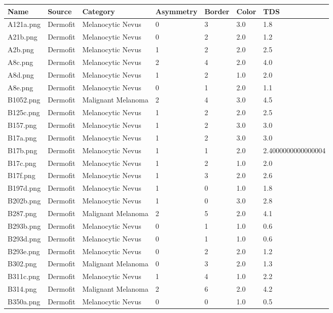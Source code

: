 
\begin{longtable}{ | l | l | l | l | l | l | l |}
\hline
Name & Source & Category & Asymmetry & Border & Color & TDS \\ \hline
A121a.png & Dermofit & Melanocytic Nevus & 0 & 3 & 3.0 & 1.8 \\
A21b.png & Dermofit & Melanocytic Nevus & 0 & 2 & 2.0 & 1.2 \\
A2b.png & Dermofit & Melanocytic Nevus & 1 & 2 & 2.0 & 2.5 \\
A8c.png & Dermofit & Melanocytic Nevus & 2 & 4 & 2.0 & 4.0 \\
A8d.png & Dermofit & Melanocytic Nevus & 1 & 2 & 1.0 & 2.0 \\
A8e.png & Dermofit & Melanocytic Nevus & 0 & 1 & 2.0 & 1.1 \\
B1052.png & Dermofit & Malignant Melanoma & 2 & 4 & 3.0 & 4.5 \\
B125c.png & Dermofit & Melanocytic Nevus & 1 & 2 & 2.0 & 2.5 \\
B157.png & Dermofit & Melanocytic Nevus & 1 & 2 & 3.0 & 3.0 \\
B17a.png & Dermofit & Melanocytic Nevus & 1 & 2 & 3.0 & 3.0 \\
B17b.png & Dermofit & Melanocytic Nevus & 1 & 1 & 2.0 & 2.4000000000000004 \\
B17c.png & Dermofit & Melanocytic Nevus & 1 & 2 & 1.0 & 2.0 \\
B17f.png & Dermofit & Melanocytic Nevus & 1 & 3 & 2.0 & 2.6 \\
B197d.png & Dermofit & Melanocytic Nevus & 1 & 0 & 1.0 & 1.8 \\
B202b.png & Dermofit & Melanocytic Nevus & 1 & 0 & 3.0 & 2.8 \\
B287.png & Dermofit & Malignant Melanoma & 2 & 5 & 2.0 & 4.1 \\
B293b.png & Dermofit & Melanocytic Nevus & 0 & 1 & 1.0 & 0.6 \\
B293d.png & Dermofit & Melanocytic Nevus & 0 & 1 & 1.0 & 0.6 \\
B293e.png & Dermofit & Melanocytic Nevus & 0 & 2 & 2.0 & 1.2 \\
B302.png & Dermofit & Malignant Melanoma & 0 & 3 & 2.0 & 1.3 \\
B311c.png & Dermofit & Melanocytic Nevus & 1 & 4 & 1.0 & 2.2 \\
B314.png & Dermofit & Malignant Melanoma & 2 & 6 & 2.0 & 4.2 \\
B350a.png & Dermofit & Melanocytic Nevus & 0 & 0 & 1.0 & 0.5 \\

\end{longtable}
